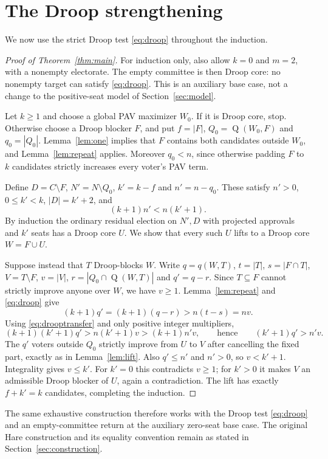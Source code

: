 \documentclass[11pt]{article}
\newcommand{\gain}{\operatorname{Q}}
\begin{document}
\section{The Droop strengthening}\label{sec:droop}
We now use the strict Droop test \eqref{eq:droop} throughout the induction.
\begin{proof}[Proof of Theorem~\ref{thm:main}]
For induction only, also allow $k=0$ and $m=2$, with a nonempty
electorate. The empty committee is then Droop core: no nonempty
target can satisfy \eqref{eq:droop}. This is an auxiliary base case,
not a change to the positive-seat model of Section~\ref{sec:model}.

Let $k\ge1$ and choose a global PAV maximizer $W_0$. If it is Droop
core, stop. Otherwise choose a Droop blocker $F$, and put
$f=|F|$, $Q_0=\gain(W_0,F)$ and $q_0=|Q_0|$.
Lemma~\ref{lem:one} implies that $F$ contains both candidates outside $W_0$,
and Lemma~\ref{lem:repeat} applies. Moreover $q_0<n$, since otherwise
padding $F$ to $k$ candidates strictly increases every voter's PAV term.

Define $D=C\setminus F$, $N'=N\setminus Q_0$, $k'=k-f$ and
$n'=n-q_0$. These satisfy $n'>0$, $0\le k'<k$, $|D|=k'+2$, and
\begin{equation}\label{eq:drooptransfer}
 (k+1)n'<n(k'+1).
\end{equation}
By induction the ordinary residual election on $N',D$ with projected
approvals and $k'$ seats has a Droop core $U$. We show that every such
$U$ lifts to a Droop core $W=F\cup U$.

Suppose instead that $T$ Droop-blocks $W$. Write
$q=q(W,T)$, $t=|T|$, $s=|F\cap T|$, $V=T\setminus F$, $v=|V|$,
$r=|Q_0\cap\gain(W,T)|$ and $q'=q-r$. Since $T\subseteq F$
cannot strictly improve anyone over $W$, we have $v\ge1$.
Lemma~\ref{lem:repeat} and \eqref{eq:droop} give
\[
 (k+1)q'=(k+1)(q-r)>n(t-s)=nv.
\]
Using \eqref{eq:drooptransfer} and only positive integer multipliers,
\[
 (k+1)(k'+1)q'>n(k'+1)v>(k+1)n'v,
 \qquad\text{hence}\qquad (k'+1)q'>n'v.
\]
The $q'$ voters outside $Q_0$ strictly improve from $U$ to $V$ after
cancelling the fixed part, exactly as in Lemma~\ref{lem:lift}.
Also $q'\le n'$ and $n'>0$, so $v<k'+1$. Integrality gives $v\le k'$.
For $k'=0$ this contradicts $v\ge1$; for $k'>0$ it makes $V$ an
admissible Droop blocker of $U$, again a contradiction.
The lift has exactly $f+k'=k$ candidates, completing the induction.
\end{proof}

The same exhaustive construction therefore works with the Droop test
\eqref{eq:droop} and an empty-committee return at the auxiliary zero-seat
base case. The original Hare construction and its equality convention
remain as stated in Section~\ref{sec:construction}.
\end{document}
